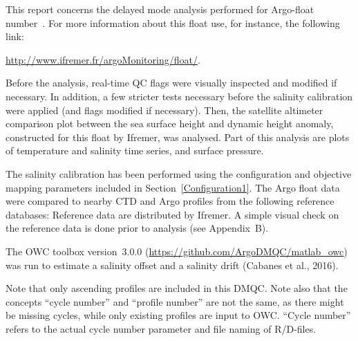 \documentclass{article}
\begin{document}
This report concerns the delayed mode analysis performed for Argo-float
number~\WMOnum. For more information about this float use, for instance,
the following link:
\begin{center}
\href{url}{http://www.ifremer.fr/argoMonitoring/float/\WMOnum}.  
\end{center}
Before the analysis, real-time QC flags were visually inspected and
modified if necessary.  In addition, a few stricter tests necessary before
the salinity calibration were applied (and flags modified if necessary).
%
Then, the satellite altimeter comparison plot between the sea surface
height and dynamic height anomaly, constructed for this float by Ifremer,
was analysed.
%
Part of this analysis are plots of temperature and salinity time
series, and surface pressure. %



The salinity calibration has been performed using the configuration and objective
mapping parameters included in Section~\ref{Configuration1}.
The Argo float data were compared to nearby CTD and Argo profiles from the
following reference databases: \texttt{} Reference
data are distributed by Ifremer.  A simple visual check on the reference
data is done prior to analysis (see Appendix~B).

The OWC toolbox version~3.0.0 %
(\href{url}{https://github.com/ArgoDMQC/matlab\_owc}) was run to estimate
a salinity offset and a salinity drift (Cabanes et al., 2016).

Note that only ascending profiles are included in this DMQC. Note also
that the concepts ``cycle number'' and ``profile number'' are not the
same, as there might be missing cycles, while only existing profiles are
input to OWC. ``Cycle number'' refers to the actual cycle number
parameter and file naming of R/D-files.
\end{document}
